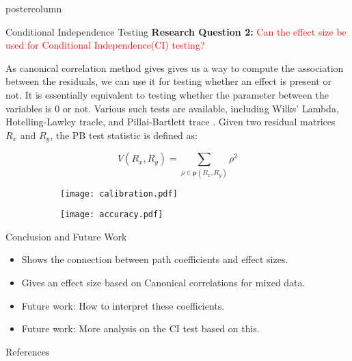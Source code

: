 \documentclass{beamer}
\newlength{\columnheight}
\begin{document}
\begin{frame}
\begin{columns}
	\begin{column}{0.33\textwidth}
		\begin{beamercolorbox}[center]{postercolumn}
			\begin{minipage}{.98\textwidth} %
				\parbox[t][\columnheight]{\textwidth}{ %
	\begin{myblock}{Conditional Independence Testing}
		\textbf{Research Question 2:} \textcolor{red}{Can the effect size be used for Conditional Independence(CI) testing?}

		As canonical correlation method gives gives us a way to compute the association between the residuals, we can use it for testing whether 
		an effect is present or not. It is essentially equivalent to testing whether the parameter between the variables is $ 0 $ or not. Various
		such tests are available, including Wilks' Lambda, Hotelling-Lawley tracle, and Pillai-Bartlett trace \citep{}. Given two residual 
		matrices $ R_x $ and $ R_y $, the PB test statistic is defined as:

		\begin{equation*}
			V(R_x, R_y) = \sum_{\rho \in \bm{\rho}(R_x, R_y)} \rho^2
		\end{equation*}

		\begin{figure}
			\begin{subfigure}{\textwidth}
				\texttt{[image: calibration.pdf]}
				\caption{}
			\end{subfigure}
			\begin{subfigure}{\textwidth}
				\texttt{[image: accuracy.pdf]}
				\caption{}
			\end{subfigure}
		\end{figure}
	\end{myblock}\vfill
	\begin{myblock}{Conclusion and Future Work}
		\begin{itemize}
			\item Shows the connection between path coefficients and effect sizes.
			\item Gives an effect size based on Canonical correlations for mixed data.
			\item Future work: How to interpret these coefficients.
			\item Future work: More analysis on the CI test based on this.
		\end{itemize}
	\end{myblock}\vfill
	\begin{myblock}{References}
		\footnotesize
		
		
	\end{myblock}\vfill
		}\end{minipage}\end{beamercolorbox}
	\end{column}
\end{columns}
\end{frame}
\end{document}
